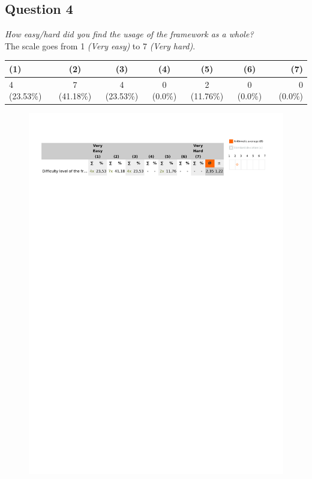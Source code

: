 \subsection{Question 4}\label{question2:4}
\emph{How easy/hard did you find the usage of the framework as a whole?}\\

The scale goes from 1 \emph{(Very easy)} to 7 \emph{(Very hard)}.
\begin{table}[H]
	\begin{center}
		\small \begin{tabular*}{1.15\columnwidth}{lcccccr}
			\\ \hline \hline
			(1) & (2) & (3) & (4) & (5) & (6) & (7) \\ \hline \hline

		 	4 (23.53\%) & 7 (41.18\%) & 4 (23.53\%) & 0 (0.0\%) & 2 (11.76\%) & 0 (0.0\%) & 0 (0.0\%)\\ \hline
		\end{tabular*}
	\end{center}
\end{table}

\begin{figure}[H]
	\centering
	\includegraphics[width=0.6\linewidth]{gfx/Chapter_EvaluationResults/ChildproofTask/question4}
\end{figure}

